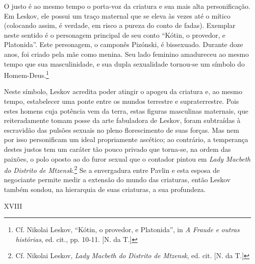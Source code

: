 O justo é ao mesmo tempo o porta-voz da criatura e sua mais alta
personificação. Em Leskov, ele possui um traço maternal que se eleva às
vezes até o mítico (colocando assim, é verdade, em risco a pureza do
conto de fadas). Exemplar neste sentido é o personagem principal de seu
conto ``Kótin, o provedor, e Platonida''. Este personagem, o camponês
Pizónski, é bissexuado. Durante doze anos, foi criado pela mãe como
menina. Seu lado feminino amadureceu ao mesmo tempo que sua
masculinidade, e sua dupla sexualidade tornou-se um símbolo do
Homem-Deus.\footnote{Cf. Nikolai Leskov, ``Kótin, o provedor, e
  Platonida'', in \emph{A Fraude e outras histórias}, ed. cit., pp.
  10-11. {[}N. da T.{]}}

Neste símbolo, Leskov acredita poder atingir o apogeu da criatura e, ao
mesmo tempo, estabelecer uma ponte entre os mundos terrestre e
supraterrestre. Pois estes homens cuja potência vem da terra, estas
figuras masculinas maternais, que reiteradamente tomam posse da arte
fabuladora de Leskov, foram subtraídas à escravidão das pulsões sexuais
no pleno florescimento de suas forças. Mas nem por isso personificam um
ideal propriamente ascético; ao contrário, a temperança destes justos
tem um caráter tão pouco privado que torna-se, na ordem das paixões, o
polo oposto ao do furor sexual que o contador pintou em \emph{Lady
Macbeth do Distrito de Mtzensk}.\footnote{Cf. Nikolai Leskov, \emph{Lady
  Macbeth do Distrito de Mtzensk}, ed. cit. {[}N. da T.{]}} Se a
envergadura entre Pavlin e esta esposa de negociante permite medir a
extensão do mundo das criaturas, então Leskov também sondou, na
hierarquia de suas criaturas, a sua profundeza.

XVIII

